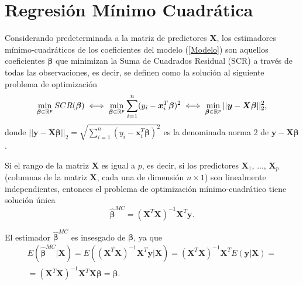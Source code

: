 \documentclass[a4paper,12pt]{report}
\begin{document}
\section{Regresión Mínimo Cuadrática}
Considerando predeterminada a la matriz de predictores $\boldsymbol{X}$, los estimadores mínimo-cuadráticos de los coeficientes del modelo (\ref{Modelo}) son aquellos coeficientes $\boldsymbol{\beta}$ que minimizan la Suma de Cuadrados Residual (SCR) a través de todas las observaciones, es decir, se definen como la solución al siguiente problema de optimización
\begin{equation}
\label{LSProblem}
\operatornamewithlimits{min}\limits_{\boldsymbol{\beta} \in \mathbb{R}^p}SCR(\boldsymbol{\beta}) \iff \operatornamewithlimits{min}\limits_{\boldsymbol{\beta} \in \mathbb{R}^p} \sum_{i=1}^n (y_i-\boldsymbol{x}_i^T\boldsymbol{\beta})^2 \iff \operatornamewithlimits{min}\limits_{\boldsymbol{\beta} \in \mathbb{R}^p} ||\boldsymbol{y}-\boldsymbol{X\beta} ||_2^2,
\end{equation}
donde $||\boldsymbol{y}-\boldsymbol{X\beta} ||_2=\sqrt{\sum_{i=1}^n (y_i-\boldsymbol{x}_i^T\boldsymbol{\beta})^2} $ es la denominada norma 2 de $\boldsymbol{y}-\boldsymbol{X\beta}$.

Si el rango de la matriz $\boldsymbol{X}$ es igual a $p$, es decir, si los predictores $\boldsymbol{X}_1$, ..., $\boldsymbol{X}_p$ (columnas de la matriz $\boldsymbol{X}$, cada una de dimensión $n \times 1$) son linealmente independientes, entonces el problema de optimización mínimo-cuadrático tiene solución única 
\begin{equation}
\label{BetaMC}
\boldsymbol{\hat{\beta}}^{MC}=(\boldsymbol{X}^T\boldsymbol{X})^{-1}\boldsymbol{X}^T\boldsymbol{y}.
\end{equation}

El estimador $\boldsymbol{\hat{\beta}}^{MC}$ es insesgado de $\boldsymbol{\beta}$, ya que
\begin{gather}
\nonumber
E\left(\boldsymbol{\hat{\beta}}^{MC}|\boldsymbol{X}\right)=E\left((\boldsymbol{X}^T\boldsymbol{X})^{-1}\boldsymbol{X}^T\boldsymbol{y}|\boldsymbol{X}\right)=(\boldsymbol{X}^T\boldsymbol{X})^{-1}\boldsymbol{X}^TE(\boldsymbol{y}|\boldsymbol{X})= \\
=(\boldsymbol{X}^T\boldsymbol{X})^{-1}\boldsymbol{X}^T\boldsymbol{X}\boldsymbol{\beta}=\boldsymbol{\beta}.
\end{gather}
\end{document}

